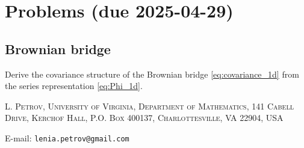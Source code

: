 \documentclass[letterpaper,11pt,oneside,reqno]{article}
\numberwithin{equation}{section}
\theoremstyle{definition}
\begin{document}
\appendix
\setcounter{section}{8}

\section{Problems (due 2025-04-29)}

\subsection{Brownian bridge}

Derive the covariance structure of the Brownian bridge
\eqref{eq:covariance_1d} from the series representation
\eqref{eq:Phi_1d}.







\medskip

\textsc{L. Petrov, University of Virginia, Department of Mathematics, 141 Cabell Drive, Kerchof Hall, P.O. Box 400137, Charlottesville, VA 22904, USA}

E-mail: \texttt{lenia.petrov@gmail.com}
\end{document}
